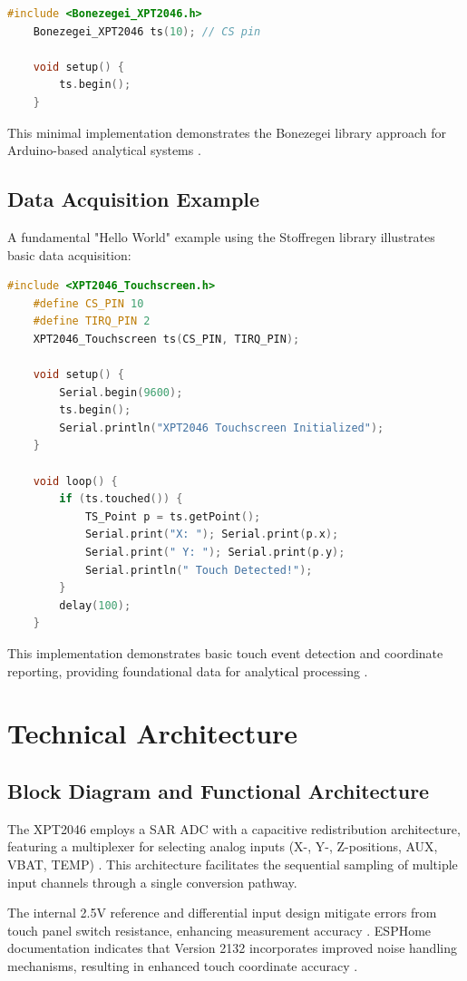 \begin{lstlisting}[language=C++]
	#include <Bonezegei_XPT2046.h>
	Bonezegei_XPT2046 ts(10); // CS pin
	
	void setup() {
		ts.begin();
	}
\end{lstlisting}

This minimal implementation demonstrates the Bonezegei library approach for Arduino-based analytical systems \cite{Bonezegei:2024}.

\subsection{Data Acquisition Example}
A fundamental "Hello World" example using the Stoffregen library illustrates basic data acquisition:

\begin{lstlisting}[language=C++]
	#include <XPT2046_Touchscreen.h>
	#define CS_PIN 10
	#define TIRQ_PIN 2
	XPT2046_Touchscreen ts(CS_PIN, TIRQ_PIN);
	
	void setup() {
		Serial.begin(9600);
		ts.begin();
		Serial.println("XPT2046 Touchscreen Initialized");
	}
	
	void loop() {
		if (ts.touched()) {
			TS_Point p = ts.getPoint();
			Serial.print("X: "); Serial.print(p.x);
			Serial.print(" Y: "); Serial.print(p.y);
			Serial.println(" Touch Detected!");
		}
		delay(100);
	}
\end{lstlisting}

This implementation demonstrates basic touch event detection and coordinate reporting, providing foundational data for analytical processing \cite{Stoffregen:2023}.

\section{Technical Architecture}
\subsection{Block Diagram and Functional Architecture}
The XPT2046 employs a SAR ADC with a capacitive redistribution architecture, featuring a multiplexer for selecting analog inputs (X-, Y-, Z-positions, AUX, VBAT, TEMP) \cite{ xpt2046:2007}. This architecture facilitates the sequential sampling of multiple input channels through a single conversion pathway.

The internal 2.5V reference and differential input design mitigate errors from touch panel switch resistance, enhancing measurement accuracy \cite{ xpt2046:2007}. ESPHome documentation indicates that Version 2132 incorporates improved noise handling mechanisms, resulting in enhanced touch coordinate accuracy \cite{ESPHome:2024}.

